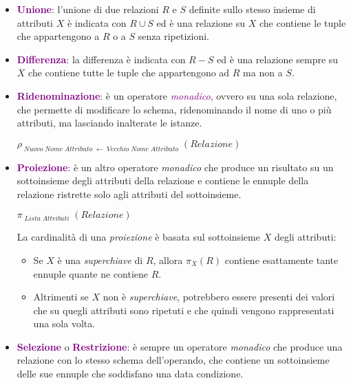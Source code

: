 \begin{itemize}
    \item \textbf{\textcolor{purple}{Unione}}: l'unione di due relazioni $R$ e $S$ definite
        sullo stesso insieme di attributi $X$ è indicata con $R \cup S$ ed è una relazione su $X$
        che contiene le tuple che appartengono a $R$ o a $S$ senza ripetizioni.
    \item \textbf{\textcolor{purple}{Differenza}}: la differenza è indicata con $R - S$ ed è una relazione sempre su
        $X$ che contiene tutte le tuple che appartengono ad $R$ ma non a $S$.
    \item \textbf{\textcolor{purple}{Ridenominazione}}: è un operatore \emph{\textcolor{purple}{monadico}}, ovvero su una sola relazione, che permette
        di modificare lo schema, ridenominando il nome di uno o più attributi, ma lasciando inalterate le istanze.
        \begin{center}
            $\rho_{\;Nuovo\;Nome\;Attributo\;\leftarrow\;Vecchio\;Nome\;Attributo}\;(Relazione)$
        \end{center}
    \item \textbf{\textcolor{purple}{Proiezione}}: è un altro operatore \emph{monadico} che produce un
        risultato su un sottoinsieme degli attributi della relazione e contiene le ennuple della
        relazione ristrette solo agli attributi del sottoinsieme.
        \begin{center}
            $\pi_{\;Lista\;Attributi}\;(Relazione)$
        \end{center}
        La cardinalità di una \emph{proiezione} è basata sul sottoinsieme $X$ degli
        attributi:
        \begin{itemize}
            \item Se $X$ è una \emph{superchiave} di $R$, allora $\pi_{X}(R)$ contiene esattamente
                tante ennuple quante ne contiene $R$.
            \item Altrimenti se $X$ non è \emph{superchiave}, potrebbero essere presenti dei valori che
                su quegli attributi sono ripetuti e che quindi vengono rappresentati una sola volta.
        \end{itemize}
    \item \textbf{\textcolor{purple}{Selezione}} o \textbf{\textcolor{purple}{Restrizione}}: è sempre un operatore
        \emph{monadico} che produce una relazione con lo stesso schema dell'operando, che contiene un sottoinsieme delle sue ennuple
        che soddisfano una data condizione.

\end{itemize}
